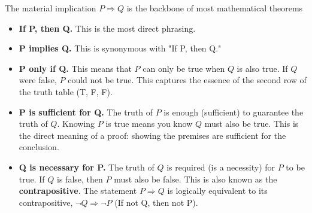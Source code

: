 \documentclass[../Main.tex]{subfiles}
\begin{document}
The material implication $P \Rightarrow Q$ is the backbone of most mathematical theorems

\begin{itemize}
    \item \textbf{If P, then Q.} This is the most direct phrasing.
    \item \textbf{P implies Q.} This is synonymous with "If P, then Q."
    \item \textbf{P only if Q.} This means that $P$ can only be true when $Q$ is also true. If $Q$ were false, $P$ could not be true. This captures the essence of the second row of the truth table (T, F, F).
    \item \textbf{P is sufficient for Q.} The truth of $P$ is enough (sufficient) to guarantee the truth of $Q$. Knowing $P$ is true means you know $Q$ must also be true. This is the direct meaning of a proof: showing the premises are sufficient for the conclusion.
    \item \textbf{Q is necessary for P.} The truth of $Q$ is required (is a necessity) for $P$ to be true. If $Q$ is false, then $P$ must also be false. This is also known as the \textbf{contrapositive}. The statement $P \Rightarrow Q$ is logically equivalent to its contrapositive, $\neg Q \Rightarrow \neg P$ (If not Q, then not P).
\end{itemize}
\end{document}

